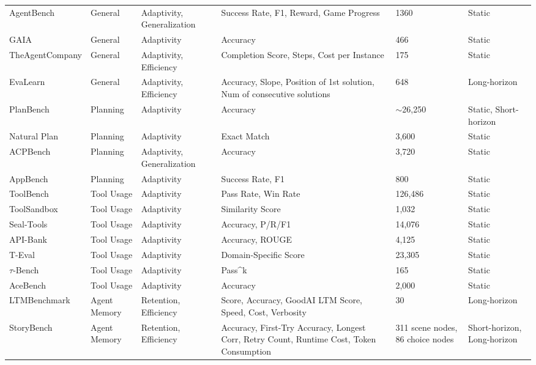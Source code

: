 \begin{table}[t!]
{\begin{tabular}{m{5.5cm}m{4.5cm}m{4cm}m{5cm}m{2.5cm}m{4cm}}
AgentBench\citep{liu2023agentbench} & General & Adaptivity, Generalization & Success Rate, F1, Reward, Game Progress & 1360 & Static \\
GAIA\citep{mialon2023gaia} & General & Adaptivity & Accuracy & 466 & Static \\
TheAgentCompany\citep{xu2024theagentcompany} & General & Adaptivity, Efficiency & Completion Score, Steps, Cost per Instance & 175 & Static \\
EvaLearn\citep{dou2025evalearnquantifyinglearningcapability} & General & Adaptivity, Efficiency & Accuracy, Slope, Position of 1st solution, Num of consecutive solutions & 648 & Long-horizon \\
PlanBench\citep{valmeekam2023planbench} & Planning & Adaptivity & Accuracy & $\sim$26,250 & Static, Short-horizon \\
Natural Plan\citep{zheng2024natural} & Planning & Adaptivity & Exact Match & 3,600 & Static \\
ACPBench\citep{kokel2025acpbench} & Planning & Adaptivity, Generalization & Accuracy & 3,720 & Static \\
AppBench~\citep{wang-etal-2024-appbench} & Planning & Adaptivity & Success Rate, F1 & 800 & Static \\
ToolBench\citep{qin2023toolllm} & Tool Usage & Adaptivity & Pass Rate, Win Rate & 126,486 & Static \\
ToolSandbox\citep{lu2024toolsandbox} & Tool Usage & Adaptivity & Similarity Score & 1,032 & Static \\
Seal-Tools\citep{wu2024seal} & Tool Usage & Adaptivity & Accuracy, P/R/F1 & 14,076 & Static \\
API-Bank\citep{li2023api} & Tool Usage & Adaptivity & Accuracy, ROUGE & 4,125 & Static \\
T-Eval\citep{chen2023t} & Tool Usage & Adaptivity & Domain-Specific Score & 23,305 & Static \\
$\tau$-Bench\citep{yao2024tau} & Tool Usage & Adaptivity & {Pass\textasciicircum k}& 165 & Static \\
AceBench\citep{chen2025acebench} & Tool Usage & Adaptivity & Accuracy & 2,000 & Static \\
LTMBenchmark\citep{castillo-bolado2024beyond} & Agent Memory & Retention, Efficiency & Score, Accuracy, GoodAI LTM Score, Speed, Cost, Verbosity & 30 & Long-horizon \\
StoryBench\citep{wan2025storybench} & Agent Memory & Retention, Efficiency & Accuracy, First-Try Accuracy, Longest Corr, Retry Count, Runtime Cost, Token Consumption & 311 scene nodes, 86 choice nodes & Short-horizon, Long-horizon \\

\end{tabular}}
\end{table}
